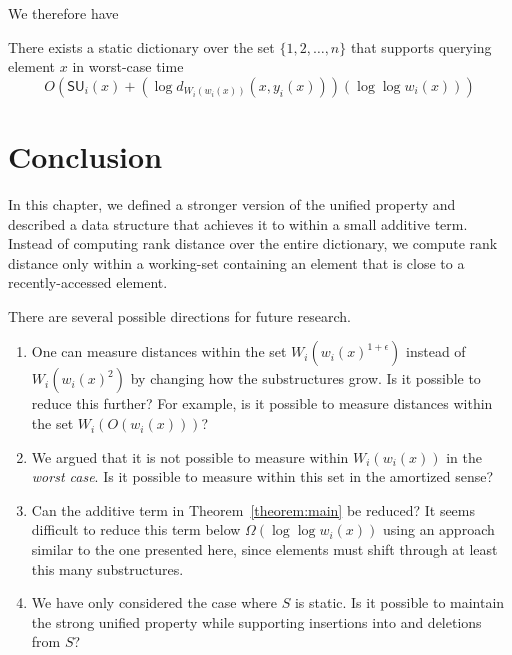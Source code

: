 \documentclass{llncs}
\newcommand{\BigOh}[1]{O\!\left(#1\right)}
\newcommand{\BigOmega}[1]{\Omega\!\left(#1\right)}
\newcommand{\SU}[1]{\textsf{SU}_i\!\left(#1\right)}
\begin{document}
We therefore have

\begin{theorem}
\label{theorem:main}
There exists a static dictionary over the set $\{1,2,\ldots,n\}$ that supports querying element $x$ in worst-case time
\begin{displaymath}
\BigOh{\SU{x} + (\log d_{W_i(w_i(x))}(x,y_i(x)))(\log \log w_i(x))}
\end{displaymath}
\end{theorem}
	
\section{Conclusion}
\label{section:conclusion}

In this chapter, we defined a stronger version of the unified property and described a data structure that achieves it to within a small additive term. Instead of computing rank distance over the entire dictionary, we compute rank distance only within a working-set containing an element that is close to a recently-accessed element.

There are several possible directions for future research.

\begin{enumerate}
\item One can measure distances within the set $W_i(w_i(x)^{1+\epsilon})$ instead of $W_i(w_i(x)^2)$ by changing how the substructures grow. Is it possible to reduce this further? For example, is it possible to measure distances within the set $W_i(\BigOh{w_i(x)})$?

\item We argued that it is not possible to measure within $W_i(w_i(x))$ in the \emph{worst case}. Is it possible to measure within this set in the amortized sense?

\item Can the additive term in Theorem~\ref{theorem:main} be reduced? It seems difficult to reduce this term below $\BigOmega{\log \log w_i(x)}$ using an approach similar to the one presented here, since elements must shift through at least this many substructures.

\item We have only considered the case where $S$ is static. Is it possible to maintain the strong unified property while supporting insertions into and deletions from $S$?
\end{enumerate}
\end{document}
